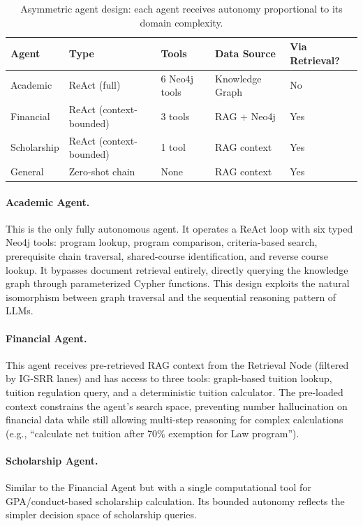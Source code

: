 \documentclass[runningheads]{llncs}
\begin{document}
\begin{table}[t]
\centering
\caption{Asymmetric agent design: each agent receives autonomy proportional to its domain complexity.}
\label{tab:agents}
\small
\begin{tabular}{@{}lllll@{}}
\toprule
\textbf{Agent} & \textbf{Type} & \textbf{Tools} & \textbf{Data Source} & \textbf{Via Retrieval?} \\
\midrule
Academic   & ReAct (full)            & 6 Neo4j tools & Knowledge Graph & No \\
Financial  & ReAct (context-bounded) & 3 tools       & RAG + Neo4j     & Yes \\
Scholarship & ReAct (context-bounded) & 1 tool       & RAG context     & Yes \\
General    & Zero-shot chain         & None          & RAG context     & Yes \\
\bottomrule
\end{tabular}
\end{table}

\paragraph{Academic Agent.} This is the only fully autonomous agent. It operates a ReAct loop with six typed Neo4j tools: program lookup, program comparison, criteria-based search, prerequisite chain traversal, shared-course identification, and reverse course lookup. It bypasses document retrieval entirely, directly querying the knowledge graph through parameterized Cypher functions. This design exploits the natural isomorphism between graph traversal and the sequential reasoning pattern of LLMs.

\paragraph{Financial Agent.} This agent receives pre-retrieved RAG context from the Retrieval Node (filtered by IG-SRR lanes) and has access to three tools: graph-based tuition lookup, tuition regulation query, and a deterministic tuition calculator. The pre-loaded context constrains the agent's search space, preventing number hallucination on financial data while still allowing multi-step reasoning for complex calculations (e.g., ``calculate net tuition after 70\% exemption for Law program'').

\paragraph{Scholarship Agent.} Similar to the Financial Agent but with a single computational tool for GPA/conduct-based scholarship calculation. Its bounded autonomy reflects the simpler decision space of scholarship queries.
\end{document}
